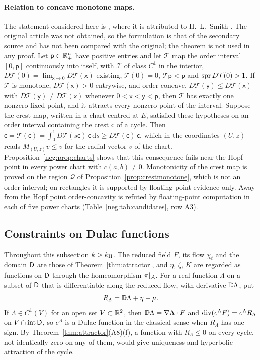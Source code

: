 \paragraph{Relation to concave monotone maps.}
The statement considered here is \cite[Theorem~1 of the preprint]{FG10}, where it is attributed to H.~L.~Smith \cite{SmithHL86}. The original article was not obtained, so the formulation is that of the secondary source and has not been compared with the original; the theorem is not used in any proof. Let $\mathsf p\in\mathbb R^n_+$ have positive entries and let $\mathcal T$ map the order interval $[0,\mathsf p]$ continuously into itself, with $\mathcal T$ of class $C^1$ in the interior, $D\mathcal T(0)=\lim_{\mathsf x\to0}D\mathcal T(\mathsf x)$ existing, $\mathcal T(0)=0$, $\mathcal T\mathsf p<\mathsf p$ and $\operatorname{spr} D\mathcal T(0)>1$. If $\mathcal T$ is monotone, $D\mathcal T(\mathsf x)>0$ entrywise, and order-concave, $D\mathcal T(\mathsf y)\le D\mathcal T(\mathsf x)$ with $D\mathcal T(\mathsf y)\ne D\mathcal T(\mathsf x)$ whenever $0<\mathsf x<\mathsf y<\mathsf p$, then $\mathcal T$ has exactly one nonzero fixed point, and it attracts every nonzero point of the interval. Suppose the crest map, written in a chart centred at $E$, satisfied these hypotheses on an order interval containing the crest $\mathsf c$ of a cycle. Then $\mathsf c=\mathcal T(\mathsf c)=\int_0^1D\mathcal T(s\mathsf c)\,\mathsf c\,\mathrm ds\ge D\mathcal T(\mathsf c)\,\mathsf c$, which in the coordinates $(U,z)$ reads $M_{(U,z)}v\le v$ for the radial vector $v$ of the chart. Proposition~\ref{neg:prop:charts} shows that this consequence fails near the Hopf point in every power chart with $c(a,b)\ne0$. Monotonicity of the crest map is proved on the region $\mathcal Q$ of Proposition~\ref{prop:crestmonotone}, which is not an order interval; on rectangles it is supported by floating-point evidence only. Away from the Hopf point order-concavity is refuted by floating-point computation in each of five power charts (Table~\ref{neg:tab:candidates}, row A3).

\subsection{Constraints on Dulac functions}\label{neg:sec:dulac}
Throughout this subsection $k>k_{\mathrm H}$. The reduced field $F$, its flow $\chi_t$ and the domain $\mathsf D$ are those of Theorem~\ref{thm:attractor}, and $\eta$, $\zeta$, $K$ are regarded as functions on $\mathsf D$ through the homeomorphism $\pi|_\mathcal A$. For a real function $\Lambda$ on a subset of $\mathsf D$ that is differentiable along the reduced flow, with derivative $\mathbb D\Lambda$, put
\[
R_\Lambda=\mathbb D\Lambda+\eta-\mu .
\]
If $\Lambda\in C^1(V)$ for an open set $V\subset\mathbb R^2$, then $\mathbb D\Lambda=\nabla\Lambda\cdot F$ and $\operatorname{div}(e^{\Lambda}F)=e^{\Lambda}R_\Lambda$ on $V\cap\operatorname{int}\mathsf D$, so $e^\Lambda$ is a Dulac function in the classical sense when $R_\Lambda$ has one sign. By Theorem~\ref{thm:attractor}(A8)(f), a function with $R_\Lambda\le0$ on every cycle, not identically zero on any of them, would give uniqueness and hyperbolic attraction of the cycle.

